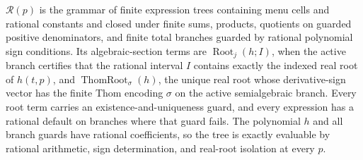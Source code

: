\(\mathcal R(p)\) is the grammar of finite expression trees containing menu cells and rational constants and closed under finite sums, products, quotients on guarded positive denominators, and finite total branches guarded by rational polynomial sign conditions.  Its algebraic-section terms are \(\operatorname{Root}_j(h;I)\), when the active branch certifies that the rational interval \(I\) contains exactly the indexed real root of \(h(t,p)\), and \(\operatorname{ThomRoot}_{\sigma}(h)\), the unique real root whose derivative-sign vector has the finite Thom encoding \(\sigma\) on the active semialgebraic branch.  Every root term carries an existence-and-uniqueness guard, and every expression has a rational default on branches where that guard fails.  The polynomial \(h\) and all branch guards have rational coefficients, so the tree is exactly evaluable by rational arithmetic, sign determination, and real-root isolation at every \(p\).